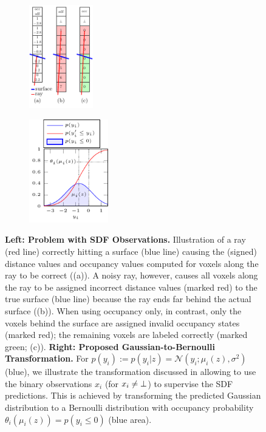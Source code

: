 \begin{figure}[t]
	\vspace*{-\figskipabove px}
	\centering
	\hfill
	\begin{subfigure}[t]{0.25\linewidth}
		\vspace{0px}
		\centering
		\includegraphics[height=4.5cm]{fig_method_sdf_2}
	\end{subfigure}
	\begin{subfigure}[t]{0.6\linewidth}
		\vspace{3px}
		\centering
		\hspace*{-12px}
		\includegraphics[height=4.5cm]{fig_method_sdf_1}
	\end{subfigure}
	\hfill
	\vspace*{-8px}
	\caption{{{\bf Left: Problem with SDF Observations.} Illustration of a ray ({\color{red}red line}) correctly hitting a surface ({\color{blue}blue line}) causing the (signed) distance values and occupancy values computed for voxels along the ray to be correct (\cf (a)). A noisy ray, however, causes all voxels along the ray to be assigned incorrect distance values (marked {\colorbox{red!25}{red}}) \wrt to the true surface ({\color{blue}blue line}) because the ray ends far behind the actual surface (\cf (b)). When using occupancy only, in contrast, only the voxels behind the surface are assigned invalid occupancy states (marked {\colorbox{red!25}{red}}); the remaining voxels are labeled correctly (marked {\colorbox{green!25}{green}}; \cf (c)).
			{\bf Right: Proposed Gaussian-to-Bernoulli Transformation.} For $p(y_i) := p(y_i | z) = \mathcal{N}(y_i;\mu_i(z), \sigma^2)$ ({\color{blue}blue}), we illustrate the transformation discussed in  allowing to use the binary observations $x_i$ (for $x_i \neq \bot$) to supervise the SDF predictions. This is achieved by transforming the predicted Gaussian distribution to a Bernoulli distribution with occupancy probability $\theta_i(\mu_i(z)) = p(y_i \leq 0)$ ({\color{blue}blue area}).}}
	\label{fig:method-sdf}
	\vspace*{-\figskipbelow px}
\end{figure}

